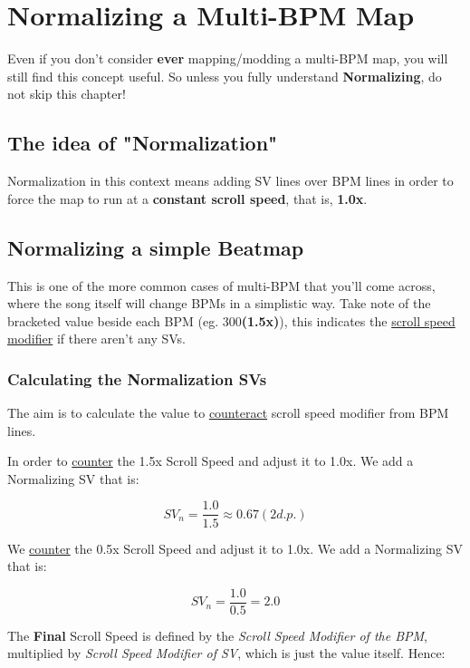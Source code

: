 \section{Normalizing a Multi-BPM Map}
Even if you don't consider \textbf{ever} mapping/modding a multi-BPM map, you will still find this concept useful. So unless you fully understand \textbf{Normalizing}, do not skip this chapter!

\subsection{The idea of "Normalization"}
Normalization in this context means adding SV lines over BPM lines in order to force the map to run at a \textbf{constant scroll speed}, that is, \textbf{1.0x}.

\subsection{Normalizing a simple Beatmap}



This is one of the more common cases of multi-BPM that you'll come across, where the song itself will change BPMs in a simplistic way. \newline
Take note of the bracketed value beside each BPM (eg. 300\textbf{(1.5x)}), this indicates the \underline{scroll speed modifier} if there aren't any SVs.

\subsubsection{Calculating the Normalization SVs}

The aim is to calculate the value to \underline{counteract} scroll speed modifier from BPM lines.
\par
In order to \underline{counter} the 1.5x Scroll Speed and adjust it to 1.0x. We add a Normalizing SV that is:

\[ SV_n = \frac{1.0}{1.5} \approx 0.67(2 d.p.) \]

We \underline{counter} the 0.5x Scroll Speed and adjust it to 1.0x. We add a Normalizing SV that is:

\[ SV_n = \frac{1.0}{0.5} = 2.0 \]


\par

The \textbf{Final} Scroll Speed is defined by the \textit{Scroll Speed Modifier of the BPM}, multiplied by \textit{Scroll Speed Modifier of SV}, which is just the value itself. Hence:


